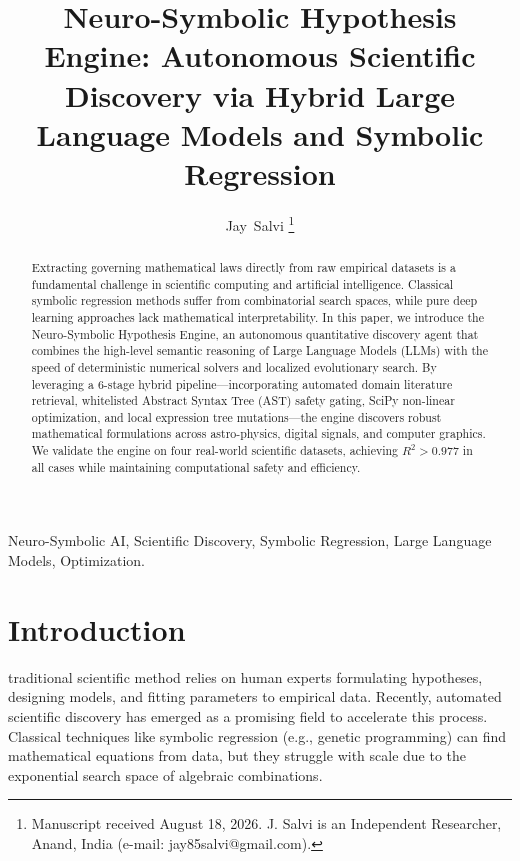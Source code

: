 \documentclass[journal]{IEEEtran}
\begin{document}
\title{Neuro-Symbolic Hypothesis Engine: Autonomous Scientific Discovery via Hybrid Large Language Models and Symbolic Regression}

\author{Jay~Salvi%
\thanks{Manuscript received August 18, 2026. J. Salvi is an Independent Researcher, Anand, India (e-mail: jay85salvi@gmail.com).}}
\maketitle

\begin{abstract}
Extracting governing mathematical laws directly from raw empirical datasets is a fundamental challenge in scientific computing and artificial intelligence. Classical symbolic regression methods suffer from combinatorial search spaces, while pure deep learning approaches lack mathematical interpretability. In this paper, we introduce the Neuro-Symbolic Hypothesis Engine, an autonomous quantitative discovery agent that combines the high-level semantic reasoning of Large Language Models (LLMs) with the speed of deterministic numerical solvers and localized evolutionary search. By leveraging a 6-stage hybrid pipeline—incorporating automated domain literature retrieval, whitelisted Abstract Syntax Tree (AST) safety gating, SciPy non-linear optimization, and local expression tree mutations—the engine discovers robust mathematical formulations across astro-physics, digital signals, and computer graphics. We validate the engine on four real-world scientific datasets, achieving $R^2 > 0.977$ in all cases while maintaining computational safety and efficiency.
\end{abstract}

\begin{IEEEkeywords}
Neuro-Symbolic AI, Scientific Discovery, Symbolic Regression, Large Language Models, Optimization.
\end{IEEEkeywords}

\section{Introduction}
 traditional scientific method relies on human experts formulating hypotheses, designing models, and fitting parameters to empirical data. Recently, automated scientific discovery has emerged as a promising field to accelerate this process. Classical techniques like symbolic regression (e.g., genetic programming) can find mathematical equations from data, but they struggle with scale due to the exponential search space of algebraic combinations.
\end{document}
